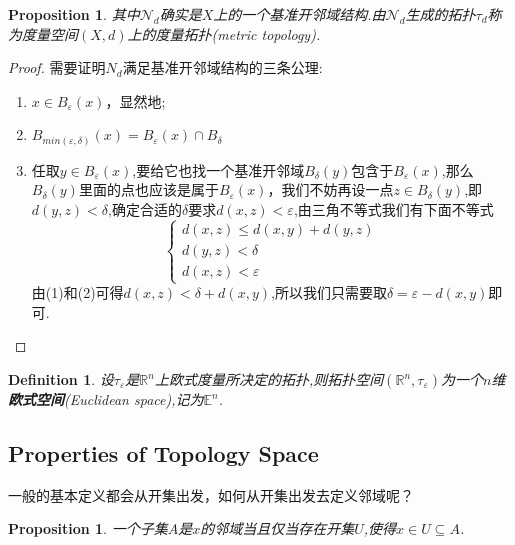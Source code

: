 \documentclass{article}
\newtheorem{proposition}[theorem]{Proposition}
\newtheorem{definition}[theorem]{Definition}
\begin{document}
\begin{proposition}
其中$\mathcal{N}_d$确实是$X$上的一个基准开邻域结构.由$\mathcal{N}_d$生成的拓扑$\tau_d$称为度量空间$(X,d)$上的度量拓扑(metric topology).
\end{proposition}

\begin{proof}
需要证明$N_d$满足基准开邻域结构的三条公理:
\begin{enumerate}
	\item $x \in B_\varepsilon(x)$，显然地;
	\item $B_{min(\varepsilon,\delta)}(x)=B_{\varepsilon}(x) \cap B_{\delta}$
	\item 任取$y \in B_{\varepsilon}(x)$,要给它也找一个基准开邻域$B_{\delta}(y)$包含于$B_{\varepsilon}(x)$,那么$B_{\delta}(y)$里面的点也应该是属于$B_{\varepsilon}(x)$，我们不妨再设一点$z \in B_{\delta}(y)$,即$d(y,z) < \delta$,确定合适的$\delta$要求$d(x,z) < \varepsilon$,由三角不等式我们有下面不等式 \[\left\{
		\begin{array}{l}
			d(x,z)\leq d(x,y) + d(y,z) \\ 
			d(y,z) < \delta  \\ 
			d(x,z) < \varepsilon 
		\end{array}
	\right.\]由(1)和(2)可得$d(x,z) < \delta + d(x,y)$,所以我们只需要取$\delta = \varepsilon - d(x,y)$即可.
\end{enumerate}
\end{proof}

\begin{definition}
设$\tau_\varepsilon$是$\mathbb{R}^n$上欧式度量所决定的拓扑,则拓扑空间$(\mathbb{R}^n,\tau_\varepsilon)$为一个$n$维\textbf{欧式空间}(Euclidean space),记为$\mathbb{E}^n$.
\end{definition}

\newpage
\subsection{Properties of Topology Space}

一般的基本定义都会从开集出发，如何从开集出发去定义邻域呢？

\begin{proposition}
一个子集$A$是$x$的邻域当且仅当存在开集$U$,使得$x \in U \subseteq A$.
\end{proposition}
\end{document}
